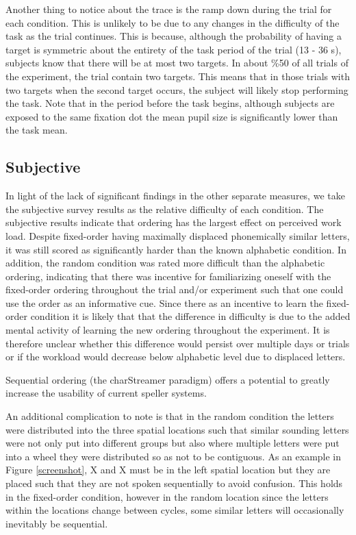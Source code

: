 \documentclass[10pt]{article}
\begin{document}
Another thing to notice about the trace is the ramp down during the
trial for each condition.  This is unlikely to be due to any changes in
the difficulty of the task as the trial continues. This is because, although
the probability of having a target is symmetric about the entirety of
the task period of the trial (13 - 36 s), subjects know that there will be at
most two targets.  In about \%50 of all trials of
the experiment, the trial contain two targets. This means that 
in those trials with two targets when the second target occurs, the subject will likely stop
performing the task.  Note that in the period before the task
begins, although subjects are exposed to the same fixation dot the
mean pupil size is significantly lower than the task mean.

\subsection{Subjective}
In light of the lack of significant findings in the other separate
measures, we take the subjective survey results as the relative
difficulty of each condition.  The subjective results indicate that
ordering has the largest effect on perceived work load. Despite
fixed-order having maximally displaced phonemically similar letters,
it was still scored as significantly harder than the known
alphabetic condition.  In addition, the random condition was rated
more difficult than the alphabetic ordering, indicating that there
was incentive for familiarizing oneself with the fixed-order
ordering throughout the trial and/or experiment such that one could
use the order as an informative cue.  Since there as an incentive to
learn the fixed-order condition it is likely that that the
difference in difficulty is due to the added mental activity of
learning the new ordering throughout the experiment. It is therefore
unclear whether this difference would persist over multiple days or
trials or if the workload would decrease below alphabetic level due
to displaced letters.

Sequential ordering (the charStreamer paradigm) offers a potential to
greatly increase the usability of current speller systems.

An additional complication to note is that in the
random condition the letters were distributed into the three
spatial locations such that similar sounding letters were not only
put into different groups but also where multiple letters were put
into a wheel they were distributed so as not to be contiguous.  As
an example in Figure \ref{screenshot}, X and X must be in the left
spatial location but they are placed such that they are not spoken
sequentially to avoid confusion.  This holds in the fixed-order
condition, however in the random location since the letters within
the locations change between cycles, some similar letters will
occasionally inevitably be sequential. 
\end{document}
